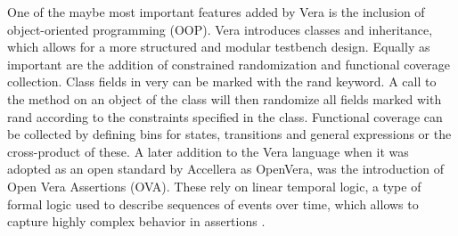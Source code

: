 One of the maybe most important features added by Vera is the inclusion of object-oriented programming (OOP). Vera
introduces classes and inheritance, which allows for a more structured and modular testbench design. Equally as
important are the addition of constrained randomization and functional coverage collection. Class fields in very can
be marked with the rand keyword. A call to the  method on an object of the class will then randomize
all fields marked with rand according to the constraints specified in the class. Functional coverage can be collected
by defining bins for states, transitions and general expressions or the cross-product of these. A later addition to
the Vera language when it was adopted as an open standard by Accellera as OpenVera, was the introduction of Open Vera
Assertions (OVA). These rely on linear temporal logic, a type of formal logic used to describe sequences of events
over time, which allows to capture highly complex behavior in assertions \cite[Sec. 7]{flake2020a}.

